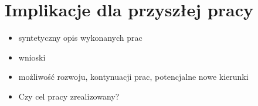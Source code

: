 \documentclass[a4paper,twoside,12pt]{book}
\begin{document}
\section{Implikacje dla przyszłej pracy}


\begin{itemize}
\item syntetyczny opis wykonanych prac
\item wnioski
\item możliwość rozwoju, kontynuacji prac, potencjalne nowe kierunki
\item Czy cel pracy zrealizowany? 
\end{itemize}



\backmatter

\printbibliography           %
\end{document}
